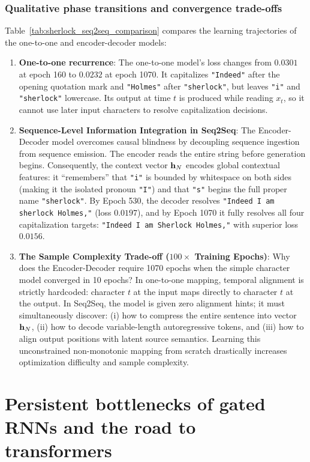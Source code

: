 \documentclass[../../main.tex]{subfiles}
\begin{document}
\subsubsection{Qualitative phase transitions and convergence trade-offs}
Table~\ref{tab:sherlock_seq2seq_comparison} compares the learning trajectories of the one-to-one and encoder-decoder models:
\begin{enumerate}
    \item \textbf{One-to-one recurrence}: The one-to-one model's loss changes from $0.0301$ at epoch 160 to $0.0232$ at epoch 1070. It capitalizes \texttt{"Indeed"} after the opening quotation mark and \texttt{"Holmes"} after \texttt{"sherlock"}, but leaves \texttt{"i"} and \texttt{"sherlock"} lowercase. Its output at time $t$ is produced while reading $x_t$, so it cannot use later input characters to resolve capitalization decisions.
    \item \textbf{Sequence-Level Information Integration in Seq2Seq}: The Encoder-Decoder model overcomes causal blindness by decoupling sequence ingestion from sequence emission. The encoder reads the entire string before generation begins. Consequently, the context vector $\mathbf{h}_N$ encodes global contextual features: it ``remembers'' that \texttt{"i"} is bounded by whitespace on both sides (making it the isolated pronoun \texttt{"I"}) and that \texttt{"s"} begins the full proper name \texttt{"sherlock"}. By Epoch 530, the decoder resolves \texttt{"Indeed I am sherlock Holmes,"} (loss $0.0197$), and by Epoch 1070 it fully resolves all four capitalization targets: \texttt{"Indeed I am Sherlock Holmes,"} with superior loss $0.0156$.
    \item \textbf{The Sample Complexity Trade-off ($100\times$ Training Epochs)}: Why does the Encoder-Decoder require 1070 epochs when the simple character model converged in 10 epochs? In one-to-one mapping, temporal alignment is strictly hardcoded: character $t$ at the input maps directly to character $t$ at the output. In Seq2Seq, the model is given zero alignment hints; it must simultaneously discover: (i) how to compress the entire sentence into vector $\mathbf{h}_N$, (ii) how to decode variable-length autoregressive tokens, and (iii) how to align output positions with latent source semantics. Learning this unconstrained non-monotonic mapping from scratch drastically increases optimization difficulty and sample complexity.
\end{enumerate}

\clearpage
\section{Persistent bottlenecks of gated RNNs and the road to transformers}
\label{sec:rnn_bottlenecks}
\end{document}
